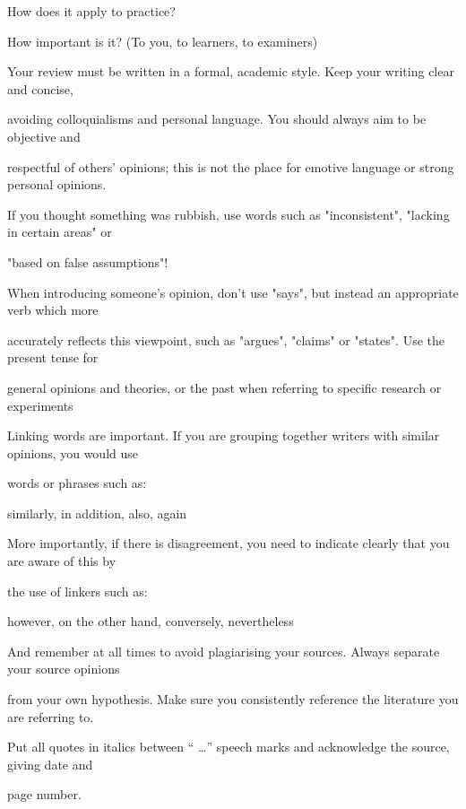 {How does it apply to practice?

How important is it? (To you, to learners, to examiners)

Your review must be written in a formal, academic style. Keep your writing clear and concise, 

avoiding colloquialisms and personal language. You should always aim to be objective and 

respectful of others' opinions; this is not the place for emotive language or strong personal opinions. 

If you thought something was rubbish, use words such as "inconsistent", "lacking in certain areas" or 

"based on false assumptions"! 

When introducing someone's opinion, don't use "says", but instead an appropriate verb which more 

accurately reflects this viewpoint, such as "argues", "claims" or "states". Use the present tense for 

general opinions and theories, or the past when referring to specific research or experiments

Linking words are important. If you are grouping together writers with similar opinions, you would use 

words or phrases such as:

similarly, in addition, also, again

More importantly, if there is disagreement, you need to indicate clearly that you are aware of this by 

the use of linkers such as:

however, on the other hand, conversely, nevertheless

And remember at all times to avoid plagiarising your sources. Always separate your source opinions 

from your own hypothesis. Make sure you consistently reference the literature you are referring to. 

Put all quotes in italics between “ …” speech marks and acknowledge the source, giving date and 

page number.}